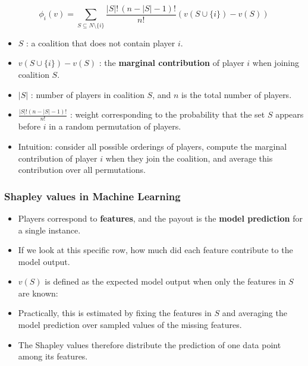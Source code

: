 \documentclass[10pt,a4paper]{article}
\begin{document}
		$$	\phi_i(v) =
		\sum_{S \subseteq N \setminus \{i\}}
		\frac{|S|!\,(n - |S| - 1)!}{n!}
		\left( v(S \cup \{i\}) - v(S) \right)
		$$
		\begin{itemize}
	
			\item $S$ : a coalition that does not contain player $i$.
	
			\item $v(S \cup \{i\}) - v(S)$ : the \textbf{marginal contribution} of player $i$ when joining coalition $S$.
	
			\item $|S|$ : number of players in coalition $S$, and $n$ is the total number of players.
	
			\item $\frac{|S|!(n-|S|-1)!}{n!}$ : weight corresponding to the probability that the set $S$ appears before $i$ in a random permutation of players.
	
			\item Intuition: consider all possible orderings of players, compute the marginal contribution of player $i$ when they join the coalition, and average this contribution over all permutations.
	
		\end{itemize}
	
		\subsubsection{Shapley values in Machine Learning}
	
		\begin{itemize}
	
			\item Players correspond to \textbf{features}, and the payout is the \textbf{model prediction} for a single instance.
			\item If we look at this specific row, how much did each feature contribute to the model output.
	
			\item $v(S)$ is defined as the expected model output when only the features in $S$ are known:
	
			\item Practically, this is estimated by fixing the features in $S$ and averaging the model prediction over sampled values of the missing features.
	
			\item The Shapley values therefore distribute the prediction of one data point among its features.
	
		\end{itemize}
	
\end{document}
